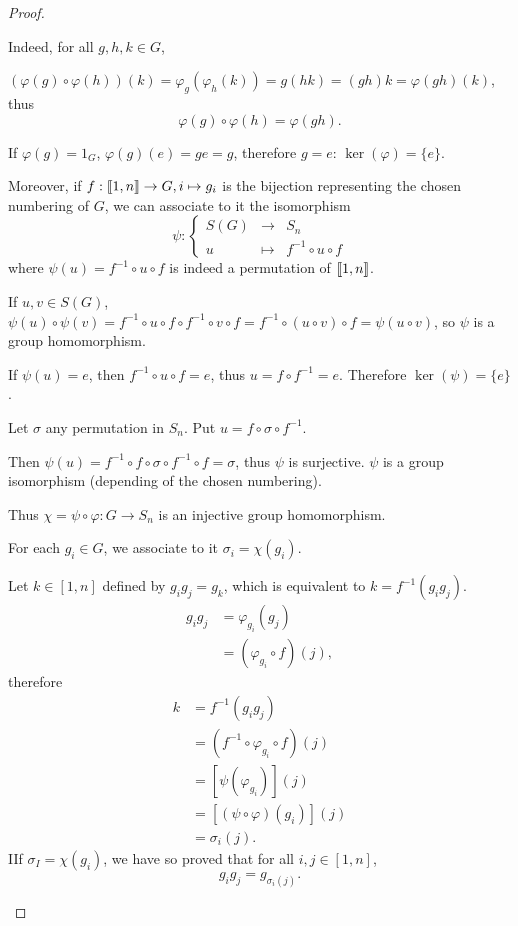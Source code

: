 \documentclass[11pt,a4paper]{article}
\def\gcro{\mbox{[\hspace{-.15em}[}}%
\def\dcro{\mbox{]\hspace{-.15em}]}}
\begin{document}
\begin{proof}
\begin{enumerate}
Indeed, for all $g,h,k \in G$, 

$(\varphi(g) \circ \varphi(h))(k) = \varphi_g(\varphi_h(k)) = g(hk) = (gh)k = \varphi(gh)(k)$, thus $$\varphi(g) \circ \varphi(h) =  \varphi(gh).$$

If $\varphi(g) = 1_G$, $\varphi(g)(e) = ge=g$, therefore $g=e$: $\ker(\varphi) = \{e\}$.

Moreover, if $f : \gcro 1,n \dcro \to G, i \mapsto g_i$ is the bijection representing the chosen numbering of $G$, we can associate to it the isomorphism
$$
\psi : 
\left\{
\begin{array}{ccc}
 S(G) &  \to  & S_n  \\
  u &  \mapsto  & f^{-1}\circ u \circ f   
\end{array}
\right.
$$
where $\psi(u) = f^{-1}\circ u \circ f$ is indeed a permutation of $\gcro 1,n \dcro$.

If $ u,v \in S(G)$, $\psi(u)\circ \psi(v) = f^{-1}\circ u \circ f \circ f^{-1} \circ v \circ f= f^{-1} \circ (u \circ v) \circ f = \psi(u\circ v)$, so $\psi$ is a group homomorphism.

If $\psi(u) = e$, then $f^{-1} \circ u \circ f = e$, thus $u = f \circ f^{-1} = e$. Therefore $\ker(\psi) = \{e\}$.

Let  $\sigma$ any permutation in $S_n$. Put  $u = f \circ \sigma \circ f^{-1}$. 

Then $\psi(u) = f^{-1} \circ f \circ \sigma \circ f^{-1} \circ f = \sigma$, thus $\psi$ is surjective. $\psi$ is a group isomorphism (depending of the chosen numbering).

Thus $\chi = \psi \circ \varphi : G \to S_n$ is an injective group homomorphism.

For each $g_i \in G$, we associate to it $\sigma_i = \chi(g_i)$.

Let $k \in [1,n]$ defined by $g_i g_j = g_k$, which is equivalent to $k = f^{-1}(g_i g_j)$.
\begin{align*}
g_i g_j &= \varphi_{g_i}(g_j)\\
&= (\varphi_{g_i} \circ f)(j),
\end{align*}
therefore 
\begin{align*}
k &= f^{-1}(g_i g_j)\\
&= (f^{-1} \circ \varphi_{g_i} \circ f)(j)\\
&=[\psi(\varphi_{g_i})](j)\\
&= [(\psi \circ \varphi)(g_i)](j)\\
&=\sigma_i(j).
\end{align*}
IIf $\sigma_I = \chi(g_i)$, we have so proved that for all $i,j \in [1,n]$,
$$g_i g_j = g_{\sigma_i(j)}.$$
\end{enumerate}

\end{proof}
\end{document}
